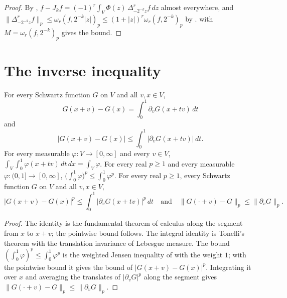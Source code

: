 \begin{proof}
\leanok
By ,
$f - J_k f = (-1)^r \int_V \Phi(z) \, \Delta^r_{-2^{-k} z} f \, dz$ almost everywhere, and
$\|\Delta^r_{-2^{-k} z} f\|_p \leq \omega_r(f, 2^{-k} |z|)_p \leq (1 + |z|)^r
\omega_r(f, 2^{-k})_p$ by .  with
$M = \omega_r(f, 2^{-k})_p$ gives the bound.
\end{proof}

\section{The inverse inequality}

\begin{lemma}
\label{lem:schwartz-differences-lp}
\leanok
{}
For every Schwartz function $G$ on $V$ and all $v, x \in V$,
\[
  G(x + v) - G(x) = \int_0^1 \partial_v G(x + t v) \, dt
\]
and
\[
  |G(x + v) - G(x)| \leq \int_0^1 |\partial_v G(x + t v)| \, dt .
\]
For every measurable $\varphi \colon V \to [0, \infty]$ and every $v \in V$,
$\int_V \int_0^1 \varphi(x + t v) \, dt \, dx = \int_V \varphi$. For every real $p \geq 1$ and every
measurable $\varphi \colon (0, 1] \to [0, \infty]$,
$\bigl(\int_0^1 \varphi\bigr)^p \leq \int_0^1 \varphi^p$. For every real $p \geq 1$, every
Schwartz function $G$ on $V$ and all $v, x \in V$,
\[
  |G(x + v) - G(x)|^p \leq \int_0^1 |\partial_v G(x + t v)|^p \, dt
  \quad \text{and} \quad
  \|G(\cdot + v) - G\|_p \leq \|\partial_v G\|_p .
\]
\end{lemma}

\begin{proof}
\leanok
The identity is the fundamental theorem of calculus along the segment from $x$ to $x + v$; the
pointwise bound follows. The integral identity is Tonelli's theorem with the translation
invariance of Lebesgue measure. The bound $(\int_0^1 \varphi)^p \leq \int_0^1 \varphi^p$ is the
weighted Jensen inequality of  with the weight $1$; with the pointwise
bound it gives the bound of
$|G(x + v) - G(x)|^p$. Integrating it over $x$ and averaging the translates of
$|\partial_v G|^p$ along the segment gives $\|G(\cdot + v) - G\|_p \leq \|\partial_v G\|_p$.
\end{proof}

